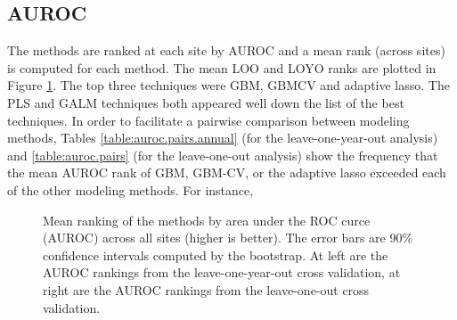 \documentclass[english]{article}\usepackage[]{graphicx}\usepackage[]{color}
\newenvironment{knitrout}{}{} %
\numberwithin{equation}{section}
\numberwithin{figure}{section}
\renewcommand\[{\begin{equation}}
\renewcommand\]{\end{equation}}
\begin{document}
\subsection{AUROC}

The methods are ranked at each site by AUROC and a mean rank (across
sites) is computed for each method. The mean LOO and LOYO ranks are
plotted in Figure \ref{fig:auroc-boxplot}. The top three techniques
were GBM, GBMCV and adaptive lasso. The PLS and GALM techniques both
appeared well down the list of the best techniques. In order to facilitate
a pairwise comparison between modeling methods, Tables \ref{table:auroc.pairs.annual}
(for the leave-one-year-out analysis) and \ref{table:auroc.pairs}
(for the leave-one-out analysis) show the frequency that the mean
AUROC rank of GBM, GBM-CV, or the adaptive lasso exceeded each of
the other modeling methods. For instance, 

\begin{knitrout}
\color{fgcolor}\begin{figure}[]
\caption[Mean ranking of the methods by area under the ROC curce (AUROC) across all sites (higher is better)]{Mean ranking of the methods by area under the ROC curce (AUROC) across all sites (higher is better). The error bars are 90\% confidence intervals computed by the bootstrap. At left are the AUROC rankings from the leave-one-year-out cross validation, at right are the AUROC rankings from the leave-one-out cross validation.\label{fig:auroc-boxplot}}
\end{figure}


\end{knitrout}
\end{document}
